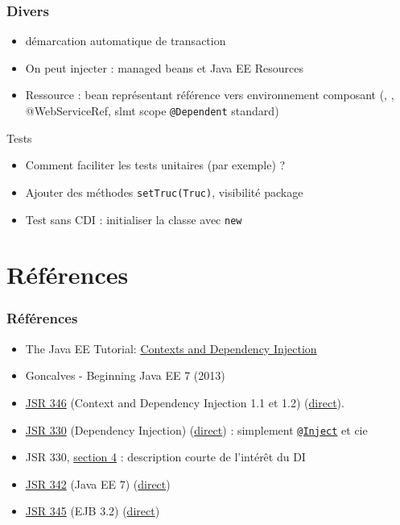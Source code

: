 \documentclass[english, french]{beamer}
\begin{document}
\begin{frame}
	\frametitle{Divers}
	\begin{itemize}
		\item {} démarcation automatique de transaction
		\item On peut injecter : managed beans et Java EE Resources
		\item Ressource : bean représentant référence vers environnement composant (, , {\tiny @WebServiceRef, slmt scope \texttt{@Dependent} standard})
	\end{itemize}
	\begin{block}{Tests}
		\begin{itemize}
			\item Comment faciliter les tests unitaires (par exemple) ? \pause
			\item Ajouter des méthodes \texttt{setTruc(Truc)}, visibilité package
			\item Test sans CDI : initialiser la classe avec \texttt{new}
		\end{itemize}
	\end{block}
\end{frame}

\section{Références}
\begin{frame}
	\frametitle{Références}
	\begin{itemize}
		\item The Java EE Tutorial: \href{http://docs.oracle.com/javaee/7/tutorial/partcdi.htm}{Contexts and Dependency Injection}
		\item Goncalves - Beginning Java EE 7 (2013)
		\item \href{https://jcp.org/en/jsr/detail?id=346}{JSR 346} (Context and Dependency Injection 1.1 et 1.2) (\href{http://download.oracle.com/otn-pub/jcp/cdi-1_2-mrel-eval-spec/cdi-1.2.pdf}{direct}).
		\item \href{https://jcp.org/en/jsr/detail?id=330}{JSR 330} (Dependency Injection) (\href{http://download.oracle.com/otn-pub/jcp/dependency_injection-1.0-final-oth-JSpec/dependency_injection-1_0-final-spec.zip}{direct}) : simplement \href{http://docs.oracle.com/javaee/7/api/javax/inject/Inject.html}{\texttt{@Inject}} et cie
		\item JSR 330, \href{https://jcp.org/en/jsr/detail?id=330\#4}{section 4} : description courte de l’intérêt du DI
		\item \href{https://jcp.org/en/jsr/detail?id=342}{JSR 342} (Java EE 7) (\href{http://download.oracle.com/otn-pub/jcp/java_ee-7-mrel-eval-spec/JavaEE_Platform_Spec.pdf}{direct})
		\item \href{https://jcp.org/en/jsr/detail?id=345}{JSR 345} (EJB 3.2) (\href{http://download.oracle.com/otn-pub/jcp/ejb-3_2-fr-eval-spec/ejb-3_2-core-fr-spec.pdf}{direct})
	\end{itemize}
\end{frame}
\end{document}
